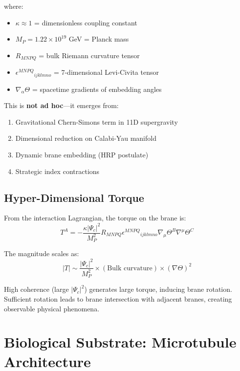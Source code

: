 \noindent where:
\begin{itemize}
\item $\kappa \approx 1$ = dimensionless coupling constant
\item $M_P = 1.22 \times 10^{19}$ GeV = Planck mass
\item $R_{MNPQ}$ = bulk Riemann curvature tensor
\item $\epsilon^{MNPQ}{}_{ijklmno}$ = 7-dimensional Levi-Civita tensor
\item $\nabla_\alpha\Theta$ = spacetime gradients of embedding angles
\end{itemize}

This is \textbf{not ad hoc}---it emerges from:
\begin{enumerate}
\item Gravitational Chern-Simons term in 11D supergravity
\item Dimensional reduction on Calabi-Yau manifold
\item Dynamic brane embedding (HRP postulate)
\item Strategic index contractions
\end{enumerate}

\subsection{Hyper-Dimensional Torque}

From the interaction Lagrangian, the torque on the brane is:
\begin{equation}
T^A = -\frac{\kappa|\Psi_c|^2}{M_P^2}R_{MNPQ}\epsilon^{MNPQ}{}_{ijklmno}\nabla_\mu\Theta^B\nabla^\mu\Theta^C
\end{equation}

\noindent The magnitude scales as:
\begin{equation}
|T| \sim \frac{|\Psi_c|^2}{M_P^2} \times (\text{Bulk curvature}) \times (\nabla\Theta)^2
\end{equation}

\begin{keyconcept}
High coherence (large $|\Psi_c|^2$) generates large torque, inducing brane rotation. Sufficient rotation leads to brane intersection with adjacent branes, creating observable physical phenomena.
\end{keyconcept}

\section{Biological Substrate: Microtubule Architecture}


